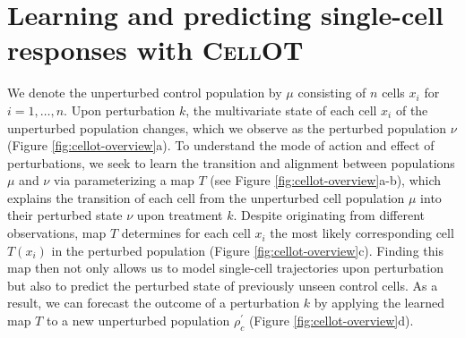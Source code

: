 \section{Learning and predicting single-cell responses with \textsc{CellOT}}


We denote the unperturbed control population by $\mu$ consisting of $n$ cells $x_i$ for $i = 1, \dots, n$.
Upon perturbation $k$, the multivariate state of each cell $x_i$ of the unperturbed population changes, which we observe as the perturbed population $\nu$ (Figure \ref{fig:cellot-overview}a).
To understand the mode of action and effect of perturbations, we seek to learn the transition and alignment between populations $\mu$ and $\nu$ via parameterizing a map $T$ (see Figure \ref{fig:cellot-overview}a-b), which explains the transition of each cell from the unperturbed cell population $\mu$ into their perturbed state $\nu$ upon treatment $k$.
Despite originating from  different observations, map $T$ determines for each cell $x_i$ the most likely corresponding cell $T(x_i)$ in the perturbed population (Figure \ref{fig:cellot-overview}c).
Finding this map then not only allows us to model single-cell trajectories upon perturbation but also to predict the perturbed state of previously unseen control cells.
As a result, we can forecast the outcome of a perturbation $k$  by applying the learned map $T$ to a new unperturbed population $\rho^\prime_c$ (Figure \ref{fig:cellot-overview}d).

